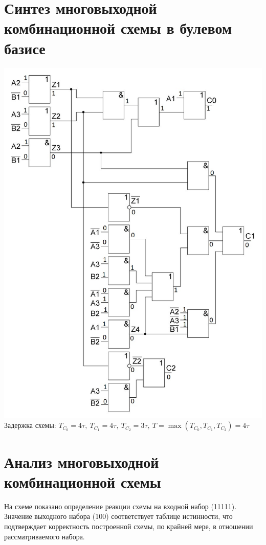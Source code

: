 \documentclass[a4paper, 12pt]{article}
\begin{document}
\section{Синтез многовыходной комбинационной схемы в булевом базисе}
\includegraphics[width=14cm]{scheme.jpg}\\

Задержка схемы: $T_{C_0}=4\tau,\ T_{C_1}=4\tau,\ T_{C_2}=3\tau,\ 
T=\max(T_{C_0}, T_{C_1},T_{C_2})=4\tau$
\section{Анализ многовыходной комбинационной схемы}

На схеме показано определение реакции схемы на входной набор (11111). Значение выходного набора (100) соответствует таблице истинности, что подтверждает корректность построенной схемы, по крайней мере, в отношении рассматриваемого набора.
\end{document}
